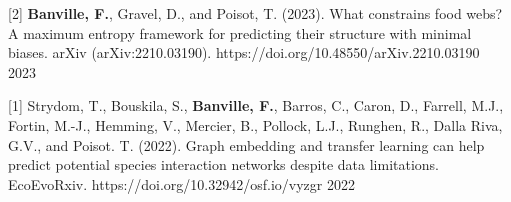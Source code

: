 \begin{cventries}

  \cventry
    {[2] \textbf{Banville, F.}, Gravel, D., and Poisot, T. (2023). What constrains food webs? A maximum entropy framework for predicting their structure with minimal biases. arXiv (arXiv:2210.03190). https://doi.org/10.48550/arXiv.2210.03190} %
    {} {} {2023} 
    {
      \begin{cvitems} %
      \end{cvitems}
    }

  \cventry
    {[1] Strydom, T., Bouskila, S., \textbf{Banville, F.}, Barros, C., Caron, D., Farrell, M.J., Fortin, M.-J., Hemming, V., Mercier, B., Pollock, L.J., Runghen, R., Dalla Riva, G.V., and Poisot. T.  (2022). Graph embedding and transfer learning can help predict potential species interaction networks despite data limitations. EcoEvoRxiv. https://doi.org/10.32942/osf.io/vyzgr} %
    {} {} {2022} 
    {
      \begin{cvitems} %
      \end{cvitems}
    }
    
\end{cventries}

